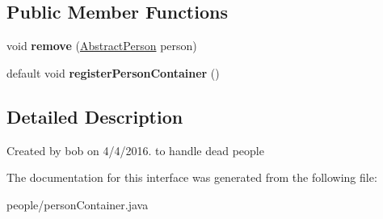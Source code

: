 \subsection*{Public Member Functions}
\begin{DoxyCompactItemize}
\item 
void {\bfseries remove} (\hyperlink{classpeople_1_1_abstract_person}{Abstract\+Person} person)\hypertarget{interfacepeople_1_1_person_container_af771c04038a3c274784e30dd4d99b76d}{}\label{interfacepeople_1_1_person_container_af771c04038a3c274784e30dd4d99b76d}

\item 
default void {\bfseries register\+Person\+Container} ()\hypertarget{interfacepeople_1_1_person_container_aa96117cd16d5526fa4c14c83c4b5404f}{}\label{interfacepeople_1_1_person_container_aa96117cd16d5526fa4c14c83c4b5404f}

\end{DoxyCompactItemize}


\subsection{Detailed Description}
Created by bob on 4/4/2016. to handle dead people 

The documentation for this interface was generated from the following file\+:\begin{DoxyCompactItemize}
\item 
people/person\+Container.\+java\end{DoxyCompactItemize}
